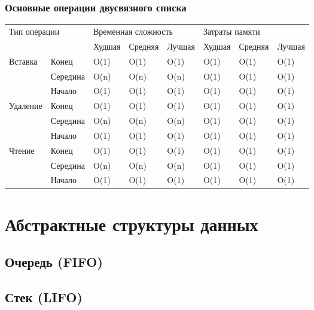\subsubsection{Основные операции двусвязного списка}
\begin{table}[h!]
\begin{tabular}{|l|l|l|l|l|l|l|l|}
\hline
\multicolumn{2}{|l|}{\multirow{2}{*}{Тип операции}} & \multicolumn{3}{l|}{Временная сложность} & \multicolumn{3}{l|}{Затраты памяти} \\ \cline{3-8} 
\multicolumn{2}{|l|}{}                  & Худшая & Средняя & Лучшая & Худшая & Средняя & Лучшая		\\ \hline
\multirow{3}{*}{Вставка}     & Конец 	& O(1) 	 & O(1)    & O(1)   & O(1)   & O(1)    & O(1)		\\ \cline{2-8} 
             & Середина & O(n) 	 & O(n)    & O(n)   & O(1)   & O(1)    & O(1)		\\ \cline{2-8} 
             & Начало 	& O(1) 	 & O(1)    & O(1)   & O(1)   & O(1)    & O(1)		\\ \hline
\multirow{3}{*}{Удаление}    & Конец 	& O(1) 	 & O(1)    & O(1)   & O(1)   & O(1)    & O(1)		\\ \cline{2-8} 
             & Середина & O(n) 	 & O(n)    & O(n)   & O(1)   & O(1)    & O(1)		\\ \cline{2-8} 
             & Начало 	& O(1) 	 & O(1)    & O(1)   & O(1)   & O(1)    & O(1)		\\ \hline
\multirow{3}{*}{Чтение}      & Конец 	& O(1) 	 & O(1)    & O(1)   & O(1)   & O(1)    & O(1)		\\ \cline{2-8} 
             & Середина & O(n) 	 & O(n)    & O(n)   & O(1)   & O(1)    & O(1)		\\ \cline{2-8} 
             & Начало 	& O(1) 	 & O(1)    & O(1)   & O(1)   & O(1)    & O(1)		\\ \hline
			
\end{tabular}
\end{table}

\section{Абстрактные структуры данных}
\subsection{Очередь (FIFO) \label{struct:fifo}}
\subsection{Стек (LIFO) \label{struct:lifo}}

